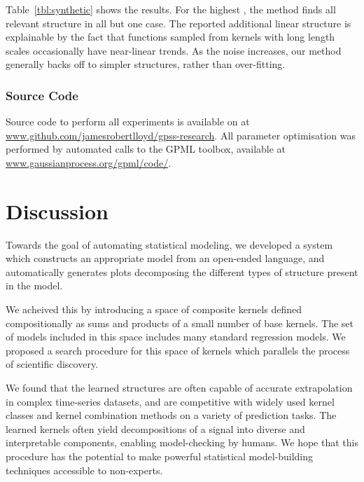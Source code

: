 Table~\ref{tbl:synthetic} shows the results.
%
For the highest \SNR{}, the method finds all relevant structure in all but one case.
The reported additional linear structure is explainable by the fact that functions sampled from \kSE{} kernels with long length scales occasionally have near-linear trends.
As the noise increases, our method generally backs off to simpler structures, rather than over-fitting.

\subsubsection{Source Code}
Source code to perform all experiments is available on at \url{www.github.com/jamesrobertlloyd/gpss-research}. 
All \gp{} parameter optimisation was performed by automated calls to the GPML toolbox, available at \url{www.gaussianprocess.org/gpml/code/}.


\section{Discussion}

Towards the goal of automating statistical modeling, we developed a system which constructs an appropriate model from an open-ended language, and automatically generates plots decomposing the different types of structure present in the model.

We acheived this by introducing a space of composite kernels defined compositionally as sums and products of a small number of base kernels.  
The set of models included in this space includes many standard regression models.
We proposed a search procedure for this space of kernels which parallels the process of scientific discovery.

We found that the learned structures are often capable of accurate extrapolation in complex time-series datasets, and are competitive with widely used kernel classes and kernel combination methods on a variety of prediction tasks.
The learned kernels often yield decompositions of a signal into diverse and interpretable components, enabling model-checking by humans.
We hope that this procedure has the potential to make powerful statistical model-building techniques accessible to non-experts.

